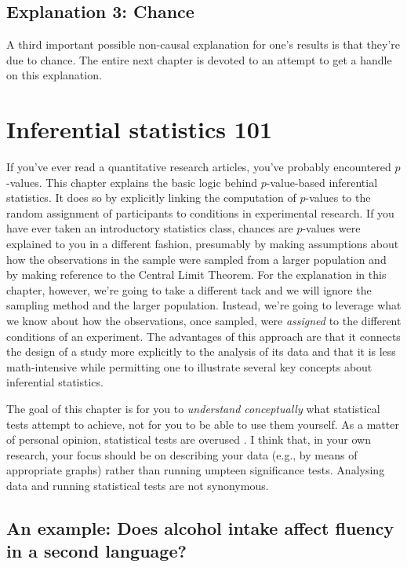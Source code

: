 \documentclass[a4paper]{tufte-book}\usepackage[]{graphicx}\usepackage[]{xcolor}
\begin{document}
\section{Explanation 3: Chance}
A third important possible non-causal explanation for one's results is that they're due to chance. 
The entire next chapter is devoted to an attempt to get a handle on this explanation.

\chapter{Inferential statistics 101}\label{ch:stats}

If you've ever read a quantitative research articles,
you've probably encountered $p$-values.
This chapter explains the basic logic
behind $p$-value-based inferential statistics.
It does so by explicitly linking the computation of $p$-values
to the random assignment of participants to conditions
in experimental research. If you have ever taken an introductory
statistics class, chances are $p$-values were explained to you
in a different fashion, presumably by making assumptions about
how the observations in the sample were sampled from a larger
population and by making reference to the Central Limit Theorem.
For the explanation in this chapter, however, we're going to take
a different tack and we will ignore the sampling method and
the larger population.
Instead, we're going to leverage what we know about how the
observations, once sampled, were \emph{assigned} to the different
conditions of an experiment. The advantages of this approach
are that it connects the design of a study more explicitly to the analysis of its data
and that it is less math-intensive while permitting one
to illustrate several key concepts about inferential statistics.

The goal of this chapter is for you to \emph{understand conceptually} what
statistical tests attempt to achieve, not for you to be able to use them
yourself. As a matter of personal opinion, statistical tests are overused
\citep{Vanhove2020b}. I think that, in your own research,
your focus should be on describing your data (e.g., by means of
appropriate graphs) rather than running umpteen significance tests.
Analysing data and running
statistical tests are not synonymous.

\medskip

\section{An example: Does alcohol intake affect fluency in a second language?}
\end{document}
